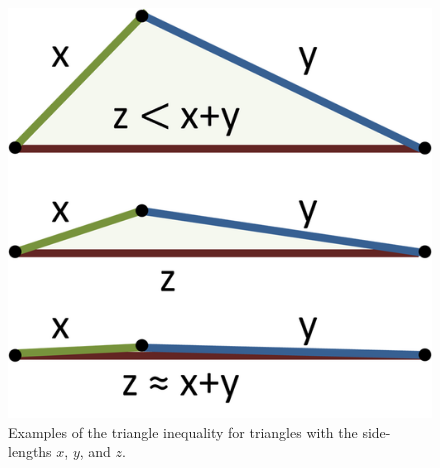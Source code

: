 \documentclass{article}
\begin{document}
\begin{enumerate}
    \begin{figure}[ht]
     \centering
     \includegraphics[scale=0.3]{docs/pictures/TriangleInequality.png}
     \caption{Examples of the triangle inequality for triangles with the side-lengths $x$, $y$, and $z$. \cite{wiki:Triangle}}
     \label{Figure:TriangleInequality}
    \end{figure}
    
\end{enumerate}
\end{document}
